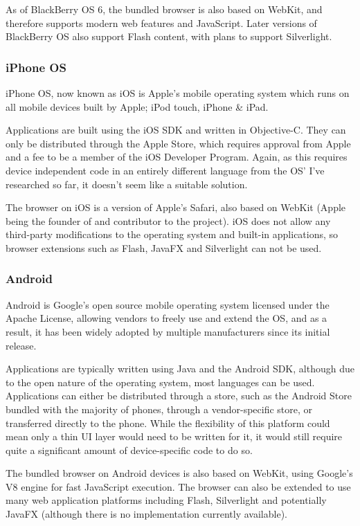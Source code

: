 \documentclass[a4papert,11pt,notitlepage]{ltxdoc}
\begin{document}
As of BlackBerry OS 6, the bundled browser is also based on WebKit\cite{rim:browser}, and therefore supports modern web features and JavaScript. Later versions of BlackBerry OS also support Flash content, with plans to support Silverlight.

\subsubsection{iPhone OS}
iPhone OS, now known as iOS is Apple's mobile operating system which runs on all mobile devices built by Apple; iPod touch, iPhone \& iPad. 

Applications are built using the iOS SDK and written in Objective-C. They can only be distributed through the Apple Store, which requires approval from Apple and a fee to be a member of the iOS Developer Program. Again, as this requires device independent code in an entirely different language from the OS' I've researched so far, it doesn't seem like a suitable solution.

The browser on iOS is a version of Apple's Safari, also based on WebKit (Apple being the founder of and contributor to the project). iOS does not allow any third-party modifications to the operating system and built-in applications, so browser extensions such as Flash, JavaFX and Silverlight can not be used.

\subsubsection{Android}
Android is Google's open source mobile operating system licensed under the Apache License, allowing vendors to freely use and extend the OS, and as a result, it has been widely adopted by multiple manufacturers since its initial release.

Applications are typically written using Java and the Android SDK, although due to the open nature of the operating system, most languages can be used. Applications can either be distributed through a store, such as the Android Store bundled with the majority of phones, through a vendor-specific store, or transferred directly to the phone. While the flexibility of this platform could mean only a thin UI layer would need to be written for it, it would still require quite a significant amount of device-specific code to do so.

The bundled browser on Android devices is also based on WebKit, using Google's V8 engine for fast JavaScript execution. The browser can also be extended to use many web application platforms including Flash, Silverlight and potentially JavaFX (although there is no implementation currently available).
\end{document}
